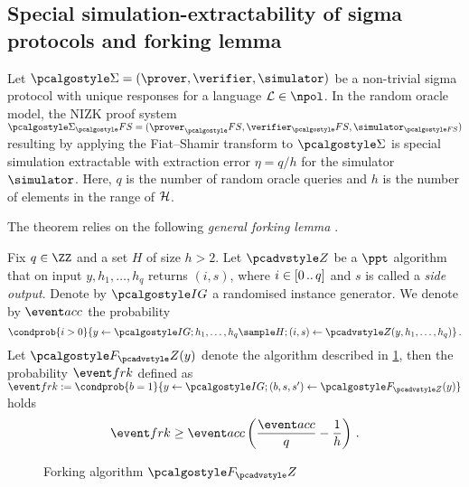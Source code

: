 \documentclass[runningheads,11pt]{llncs}
\begin{document}
\subsection{Special simulation-extractability of sigma protocols and forking lemma}
\label{sec:forking_lemma}
\begin{theorem}
	Let $\sigmaprot = (\prover, \verifier, \simulator)$ be a non-trivial sigma
  protocol with unique responses for a language $\LANG \in \npol$. In the random
  oracle model, the NIZK proof system $\sigmaprot_\fs = (\prover_\fs,
  \verifier_\fs, \simulator_{\fs})$ resulting by applying the Fiat--Shamir
  transform to $\sigmaprot$ is special simulation extractable with extraction error
  $\eta = q/h$ for the simulator $\simulator$. Here, $q$ is the number of random
  oracle queries and $h$ is the number of elements in the range of $\mathcal{H}$.
\end{theorem}

The theorem relies on the following \emph{general forking lemma} \cite{JC:PoiSte00}.

\begin{lemma}
	\label{lem:forking_lemma}
	Fix $q \in \ZZ$ and a set $H$ of size $h > 2$. Let $\zdv$ be a $\ppt$
  algorithm that on input $y, h_1, \ldots, h_q$ returns $(i, s)$, where $i
  \in[0 \, .. \, q]$ and $s$ is called a \emph{side output}. Denote by $\ig$ a
  randomised instance generator. We denote by $\accProb$ the probability
	\[
		\condprob{i > 0}{y \gets \ig; h_1, \ldots, h_q \sample H; (i, s) \gets
		\zdv(y, h_1, \ldots, h_q)}\,.
	\]
	Let $\forking_\zdv(y)$ denote the algorithm described in
  \cref{fig:forking_lemma}, then the probability $\frkProb$ defined as $
  \frkProb := \condprob{b = 1}{y \gets \ig; (b, s, s') \gets \forking_{\zdv}(y)}
  $ holds
	\[
		\frkProb \geq \accProb \brak{\frac{\accProb}{q} - \frac{1}{h}}\,.
	\]
	\begin{figure}
		\centering
		\caption{Forking algorithm $\forking_\zdv$}
		\label{fig:forking_lemma}
\end{figure}
\end{lemma}
\end{document}
